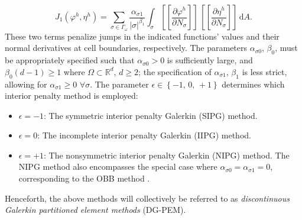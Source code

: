 	\begin{equation}
		J_1 (\varphi^h,\eta^h) = \sum_{\sigma \in \Gamma_\omega} \frac{\alpha_{\sigma1}}{|\sigma|^{\beta_1}} \int_{\sigma} \left[\!\!\left[ \frac{\partial \varphi^h}{\partial N_{\sigma}} \right]\!\!\right] \, \left[\!\!\left[ \frac{\partial \eta^h}{\partial N_{\sigma}} \right]\!\!\right] \, \mathrm dA.
	\end{equation}
	These two terms penalize jumps in the indicated functions' values and their normal derivatives at cell boundaries, respectively. The parameters $\alpha_{\sigma0}$, $\beta_0$, must be appropriately specified such that $\alpha_{\sigma0} > 0$ is sufficiently large, and $\beta_0 (d-1) \geq 1$ where $\Omega \subset \mathbb{R}^d$, $d \geq 2$; the specification of $\alpha_{\sigma1}$, $\beta_1$ is less strict, allowing for $\alpha_{\sigma1} \geq 0 \, \, \forall \sigma$. The parameter $\epsilon \in \left\{ -1, \, 0, \, +1 \right\}$ determines which interior penalty method is employed:
	\begin{itemize}
		\item[] $\epsilon = -1$: The symmetric interior penalty Galerkin (SIPG) method.
		\item[] $\epsilon = 0$: The incomplete interior penalty Galerkin (IIPG) method.
		\item[] $\epsilon = +1$: The nonsymmetric interior penalty Galerkin (NIPG) method. The NIPG method also encompasses the special case where $\alpha_{\sigma0} = \alpha_{\sigma1} = 0$, corresponding to the OBB method \cite{Oden:98}.
	\end{itemize}
	Henceforth, the above methods will collectively be referred to as \textit{discontinuous Galerkin partitioned element methods} (DG-PEM).
	
